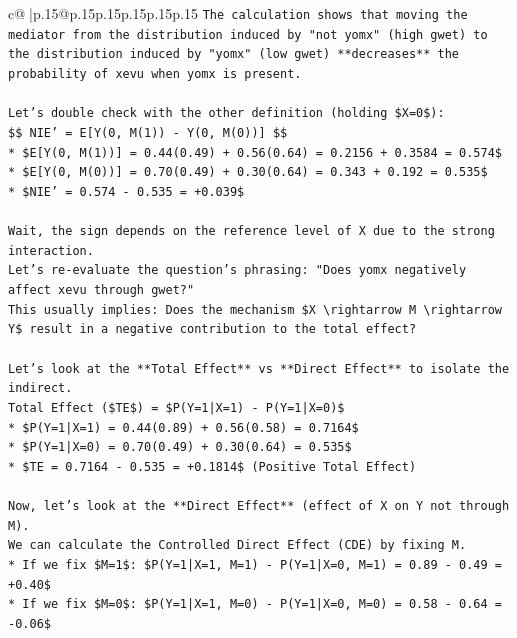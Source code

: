 \documentclass{article}
\begin{document}
{\begin{supertabular}{c@{$\;$}|p{.15\linewidth}@{}p{.15\linewidth}p{.15\linewidth}p{.15\linewidth}p{.15\linewidth}p{.15\linewidth}}
{{{\texttt{The calculation shows that moving the mediator from the distribution induced by "not yomx" (high gwet) to the distribution induced by "yomx" (low gwet) **decreases** the probability of xevu when yomx is present.} \\
\\ 
\texttt{Let's double check with the other definition (holding \$X=0\$):} \\
\texttt{\$\$ NIE' = E{[}Y(0, M(1)) {-} Y(0, M(0)){]} \$\$} \\
\texttt{*   \$E{[}Y(0, M(1)){]} = 0.44(0.49) + 0.56(0.64) = 0.2156 + 0.3584 = 0.574\$} \\
\texttt{*   \$E{[}Y(0, M(0)){]} = 0.70(0.49) + 0.30(0.64) = 0.343 + 0.192 = 0.535\$} \\
\texttt{*   \$NIE' = 0.574 {-} 0.535 = +0.039\$} \\
\\ 
\texttt{Wait, the sign depends on the reference level of X due to the strong interaction.} \\
\texttt{Let's re{-}evaluate the question's phrasing: "Does yomx negatively affect xevu through gwet?"} \\
\texttt{This usually implies: Does the mechanism \$X \textbackslash{}rightarrow M \textbackslash{}rightarrow Y\$ result in a negative contribution to the total effect?} \\
\\ 
\texttt{Let's look at the **Total Effect** vs **Direct Effect** to isolate the indirect.} \\
\texttt{Total Effect (\$TE\$) = \$P(Y=1|X=1) {-} P(Y=1|X=0)\$} \\
\texttt{*   \$P(Y=1|X=1) = 0.44(0.89) + 0.56(0.58) = 0.7164\$} \\
\texttt{*   \$P(Y=1|X=0) = 0.70(0.49) + 0.30(0.64) = 0.535\$} \\
\texttt{*   \$TE = 0.7164 {-} 0.535 = +0.1814\$ (Positive Total Effect)} \\
\\ 
\texttt{Now, let's look at the **Direct Effect** (effect of X on Y not through M).} \\
\texttt{We can calculate the Controlled Direct Effect (CDE) by fixing M.} \\
\texttt{*   If we fix \$M=1\$: \$P(Y=1|X=1, M=1) {-} P(Y=1|X=0, M=1) = 0.89 {-} 0.49 = +0.40\$} \\
\texttt{*   If we fix \$M=0\$: \$P(Y=1|X=1, M=0) {-} P(Y=1|X=0, M=0) = 0.58 {-} 0.64 = {-}0.06\$} \\
\\ 
}}}
\end{supertabular}}
\end{document}
